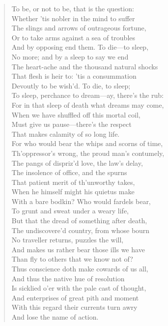 \documentclass[10pt]{memoir}
\begin{document}
\begin{verse}
To be, or not to be, that is the question:\\
Whether 'tis nobler in the mind to suffer\\
The slings and arrows of outrageous fortune,\\
Or to take arms against a sea of troubles\\
And by opposing end them. To die---to sleep,\\
No more; and by a sleep to say we end\\
The heart-ache and the thousand natural shocks\\
That flesh is heir to: 'tis a consummation\\
Devoutly to be wish'd. To die, to sleep;\\
To sleep, perchance to dream---ay, there's the rub:\\
For in that sleep of death what dreams may come,\\
When we have shuffled off this mortal coil,\\
Must give us pause---there's the respect\\
That makes calamity of so long life.\\
For who would bear the whips and scorns of time,\\
Th'oppressor's wrong, the proud man's contumely,\\
The pangs of dispriz'd love, the law's delay,\\
The insolence of office, and the spurns\\
That patient merit of th'unworthy takes,\\
When he himself might his quietus make\\
With a bare bodkin? Who would fardels bear,\\
To grunt and sweat under a weary life,\\
But that the dread of something after death,\\
The undiscovere'd country, from whose bourn\\
No traveller returns, puzzles the will,\\
And makes us rather bear those ills we have\\
Than fly to others that we know not of?\\
Thus conscience doth make cowards of us all,\\
And thus the native hue of resolution\\
Is sicklied o'er with the pale cast of thought,\\
And enterprises of great pith and moment\\
With this regard their currents turn awry\\
And lose the name of action.
\end{verse}
\end{document}
